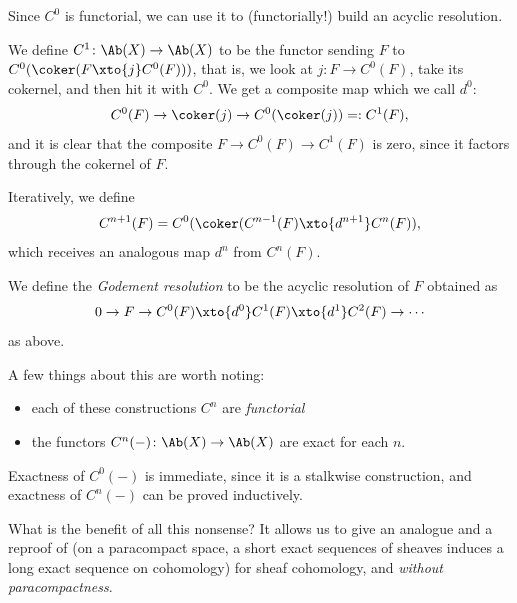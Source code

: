 \documentclass[11pt]{amsart}
\begin{document}
Since $C^0$ is functorial, we can use it to (functorially!) build an acyclic resolution.

\begin{notation} We define $C^1 \colon \Ab(X) \to \Ab(X)$ to be the functor sending $F$ to $C^0(\coker(F \xto{j}C^0(F)))$, that is, we look at $j \colon F \to C^0(F)$, take its cokernel, and then hit it with $C^0$. We get a composite map which we call $d^0$:
\begin{align*}
    C^0(F) \to \coker(j) \to C^0(\coker(j)) =: C^1(F),
\end{align*}
and it is clear that the composite $F \to C^0(F) \to C^1(F)$ is zero, since it factors through the cokernel of $F$.

Iteratively, we define
\begin{align*}
    C^{n+1}(F) = C^0(\coker(C^{n-1}(F) \xto{d^{n+1}} C^n(F)),
\end{align*}
which receives an analogous map $d^n$ from $C^n(F)$.
\end{notation}

\begin{definition}\label{def:godement-resolution} 
We define the \textit{Godement resolution} to be the acyclic resolution of $F$ obtained as
\begin{align*}
    0 \to F \to C^0(F) \xto{d^0} C^1(F) \xto{d^1} C^2(F) \to \cdots 
\end{align*}
as above.
\end{definition}

\begin{remark} A few things about this are worth noting:
\begin{itemize}
    \item each of these constructions $C^n$ are \emph{functorial}
    \item the functors $C^n(-) \colon \Ab(X) \to \Ab(X)$ are exact for each $n$.
\end{itemize}
Exactness of $C^0(-)$ is immediate, since it is a stalkwise construction, and exactness of $C^n(-)$ can be proved inductively.
\end{remark}

What is the benefit of all this nonsense? It allows us to give an analogue and a reproof of  (on a paracompact space, a short exact sequences of sheaves induces a long exact sequence on cohomology) for sheaf cohomology, and \emph{without paracompactness}.
\end{document}
